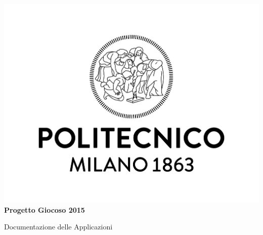 \begin{titlepage}
\begin{center}
\vspace*{2cm}
\includegraphics[width=\textwidth]{polimi_logo.jpg}
\Huge
\textbf{Progetto Giocoso 2015}

Documentazione delle Applicazioni
\end{center}
\end{titlepage}
